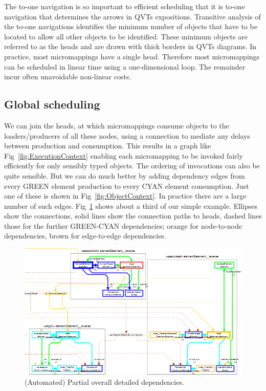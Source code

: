 \documentclass{llncs}
\begin{document}
The to-one navigation is so important to efficient scheduling that it is to-one navigation that determines the arrows in QVTs expositions. Transitive analysis of the to-one navigations identifies the minimum number of objects that have to be located to allow all other objects to be identified. These minimum objects are referred to as the heads and are drawn with thick borders in QVTs diagrams. In practice, most micromappings have a single head. Therefore most micromappings can be scheduled in linear time using a one-dimensional loop. The remainder incur often unavoidable non-linear costs.

\subsection{Global scheduling}

We can join the heads, at which micromappings consume objects to the loaders/producers of all these nodes, using a connection to mediate any delays between production and consumption. This results in a graph like Fig~\ref{fig:ExecutionContext} enabling each micromapping to be invoked fairly efficiently for only sensibly typed objects. The ordering of invocations can also be quite sensible. But we can do much better by adding dependency edges from every GREEN element production to every CYAN element consumption. Just one of these is shown in Fig~\ref{fig:ObjectContext}. In practice there are a large number of such edges. Fig~\ref{fig:QVTsPartialDependencies} shows about a third of our simple example. Ellipses show the connections, solid lines show the connection paths to heads, dashed lines those for the further GREEN-CYAN dependencies; orange for node-to-node dependencies, brown for edge-to-edge dependencies.

\begin{figure}[h]
	\centering
	\includegraphics[width=1.0\textwidth]{QVTsFullDependencies.png}
	\caption{(Automated) Partial overall detailed dependencies.}
	\label{fig:QVTsPartialDependencies}
\end{figure}
\end{document}
